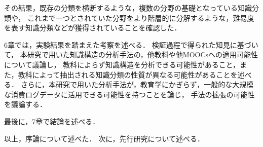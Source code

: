 その結果，既存の分類を横断するような，複数の分野の基礎となっている知識分類や，
これまで一つとされていた分野をより階層的に分解するような，難易度を表す知識分類などが獲得されていることを確認した．



6章では，実験結果を踏まえた考察を述べる．
検証過程で得られた知見に基づいて，
本研究で用いた知識構造の分析手法の，他教科や他MOOCsへの適用可能性について議論し，
教科によらず知識構造を分析できる可能性があること，また，教科によって抽出される知識分類の性質が異なる可能性があることを述べる．
さらに，本研究で用いた分析手法が，教育学にかぎらず，一般的な大規模な消費ログデータに活用できる可能性を持つことを論じ，
手法の拡張の可能性を議論する．


最後に，7章で結論を述べる．



\vvspace
以上，序論について述べた．
次に，先行研究について述べる．


